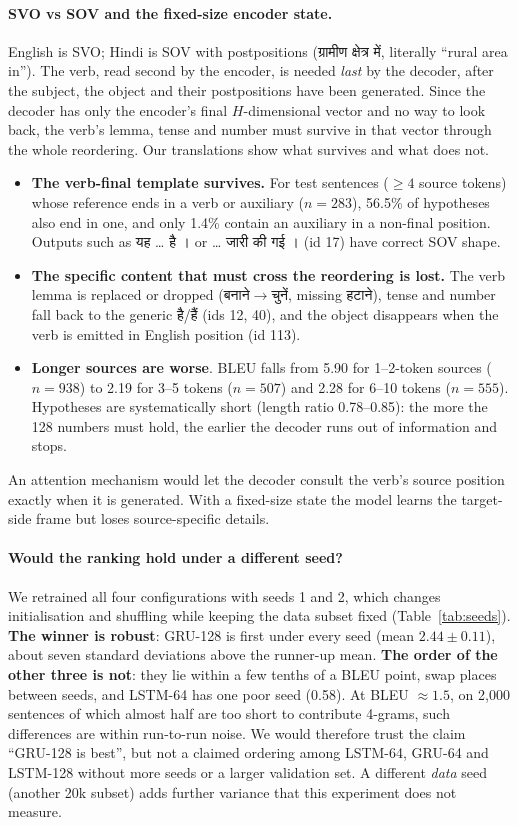 \documentclass[10pt,a4paper]{article}
\newcommand{\hi}[1]{{\hindifont #1}}
\begin{document}
\paragraph{SVO vs SOV and the fixed-size encoder state.} English is SVO; Hindi is SOV with postpositions
(\hi{ग्रामीण क्षेत्र में}, literally ``rural area in''). The verb, read second by the encoder, is needed
\emph{last} by the decoder, after the subject, the object and their postpositions have been generated. Since
the decoder has only the encoder's final $H$-dimensional vector and no way to look back, the verb's lemma,
tense and number must survive in that vector through the whole reordering. Our translations show what
survives and what does not.
\begin{itemize}
\item \textbf{The verb-final template survives.} For test sentences ($\ge4$ source tokens) whose reference
ends in a verb or auxiliary ($n=283$), 56.5\% of hypotheses also end in one, and only 1.4\% contain an
auxiliary in a non-final position. Outputs such as \hi{यह … है ।} or \hi{… जारी की गई ।} (id 17) have
correct SOV shape.
\item \textbf{The specific content that must cross the reordering is lost.} The verb lemma is replaced or
dropped (\hi{बनाने}$\to$\hi{चुनें}, missing \hi{हटाने}), tense and number fall back to the generic
\hi{है/हैं} (ids 12, 40), and the object disappears when the verb is emitted in English position (id 113).
\item \textbf{Longer sources are worse}. BLEU falls from 5.90 for 1--2-token sources ($n=938$) to 2.19 for
3--5 tokens ($n=507$) and 2.28 for 6--10 tokens ($n=555$). Hypotheses are systematically short
(length ratio 0.78--0.85): the more the 128 numbers must hold, the earlier the decoder runs out of
information and stops.
\end{itemize}
An attention mechanism would let the decoder consult the verb's source position exactly when it is generated.
With a fixed-size state the model learns the target-side frame but loses source-specific details.

\paragraph{Would the ranking hold under a different seed?} We retrained all four configurations with seeds
1 and 2, which changes initialisation and shuffling while keeping the data subset fixed
(Table~\ref{tab:seeds}). \textbf{The winner is robust}: GRU-128 is first under every seed (mean
$2.44\pm0.11$), about seven standard deviations above the runner-up mean. \textbf{The order of the other three
is not}: they lie within a few tenths of a BLEU point, swap places between seeds, and LSTM-64 has one poor seed
(0.58). At BLEU $\approx1.5$, on 2{,}000 sentences of which almost half are too short to contribute 4-grams,
such differences are within run-to-run noise. We would therefore trust the claim ``GRU-128 is best'', but not a
claimed ordering among LSTM-64, GRU-64 and LSTM-128 without more seeds or a larger validation set. A different
\emph{data} seed (another 20k subset) adds further variance that this experiment does not measure.
\end{document}
